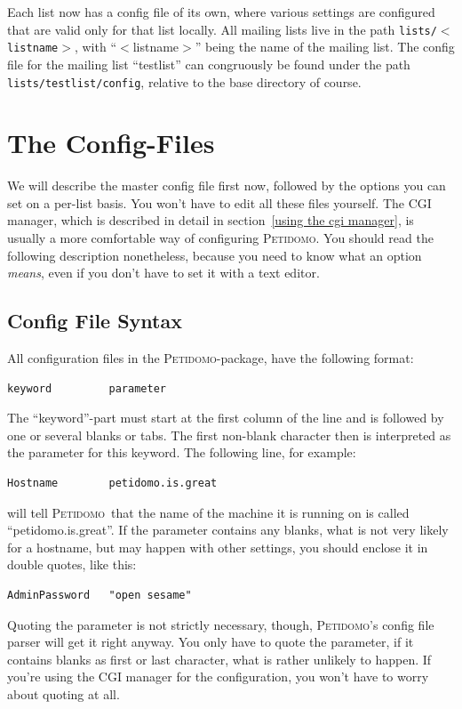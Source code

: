 \documentclass[a4paper]{report}
\newcommand{\Petidomo}{{\scshape Peti\-domo}}
\newcommand{\file}[1]{{\tt #1}}
\begin{document}
Each list now has a config file of its own, where various settings are
configured that are valid only for that list locally. All mailing
lists live in the path \file{lists/$<$listname$>$}, with ``$<$listname$>$''
being the name of the mailing list. The config file for the mailing
list ``testlist'' can congruously be found under the path
\file{lists/testlist/config}, relative to the base directory of
course.

\section{The Config-Files}

We will describe the master config file first now, followed by the
options you can set on a per-list basis. You won't have to edit all
these files yourself. The CGI manager, which is described in detail in
section~\ref{using the cgi manager}, is usually a more comfortable way
of configuring \Petidomo. You should read the following description
nonetheless, because you need to know what an option \emph{means},
even if you don't have to set it with a text editor.

\subsection{Config File Syntax}

All configuration files in the \Petidomo-package\label{Config file format}, have the following format:
\begin{verbatim}
keyword         parameter
\end{verbatim}

The ``keyword''-part must start at the first column of the line and is
followed by one or several blanks or tabs. The first non-blank
character then is interpreted as the parameter for this keyword. The
following line, for example:
\begin{verbatim}
Hostname        petidomo.is.great
\end{verbatim}
will tell \Petidomo\ that the name of the machine it is running on is
called ``petidomo.is.great''. If the parameter contains any blanks,
what is not very likely for a hostname, but may happen with other
settings, you should enclose it in double quotes, like this:
\begin{verbatim}
AdminPassword   "open sesame"
\end{verbatim}

Quoting the parameter is not strictly necessary, though, \Petidomo's
config file parser will get it right anyway. You only have to quote
the parameter, if it contains blanks as first or last character, what
is rather unlikely to happen. If you're using the CGI manager for the
configuration, you won't have to worry about quoting at all.
\end{document}
